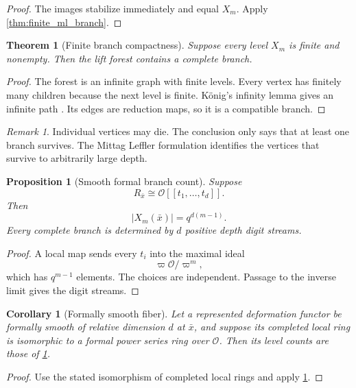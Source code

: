 \documentclass{aomart}
\newtheorem{theorem}{Theorem}[section]
\newtheorem{proposition}[proposition]{Proposition}
\newtheorem{corollary}[corollary]{Corollary}
\theoremstyle{definition}
\theoremstyle{remark}
\newtheorem{remark}[remark]{Remark}
\newcommand{\OO}{\mathcal O}
\newcommand{\abs}[1]{\left\lvert#1\right\rvert}
\begin{document}
\begin{proof}
The images stabilize immediately and equal \(X_m\). Apply \cref{thm:finite_ml_branch}.
\end{proof}

\begin{theorem}[Finite branch compactness]\label{thm:konig_branch}
Suppose every level \(X_m\) is finite and nonempty. Then the lift forest contains a complete branch.
\end{theorem}

\begin{proof}
The forest is an infinite graph with finite levels. Every vertex has finitely many children because the next level is finite. K\"onig's infinity lemma gives an infinite path \cite{Diestel2017}. Its edges are reduction maps, so it is a compatible branch.
\end{proof}

\begin{remark}\label{rem:dead_nodes}
Individual vertices may die. The conclusion only says that at least one branch survives. The Mittag Leffler formulation identifies the vertices that survive to arbitrarily large depth.
\end{remark}

\begin{proposition}[Smooth formal branch count]\label{prop:smooth_count}
Suppose
\[
R_{\bar x}
\cong
\OO[[t_1,\ldots,t_d]].
\]
Then
\[
\boxed{
\abs{X_m(\bar x)}
=
q^{d(m-1)}.
}
\]
Every complete branch is determined by \(d\) positive depth digit streams.
\end{proposition}

\begin{proof}
A local map sends every \(t_i\) into the maximal ideal
\[
\varpi\OO/\varpi^m,
\]
which has \(q^{m-1}\) elements. The choices are independent. Passage to the inverse limit gives the digit streams.
\end{proof}

\begin{corollary}[Formally smooth fiber]\label{cor:formally_smooth_count}
Let a represented deformation functor be formally smooth of relative dimension \(d\) at \(\bar x\), and suppose its completed local ring is isomorphic to a formal power series ring over \(\OO\). Then its level counts are those of \cref{prop:smooth_count}.
\end{corollary}

\begin{proof}
Use the stated isomorphism of completed local rings and apply \cref{prop:smooth_count}.
\end{proof}
\end{document}
